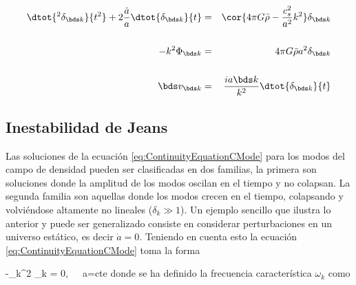 \begin{eqnarray}
\label{eq:ContinuityEquationCMode}
\dtot{^2 \delta_{\bds k}}{t^2} + 2\frac{\dot a}{a}\dtot{\delta_{\bds k}}{t} &=& 
\cor{ 4\pi G \bar \rho - \frac{c_s^2}{a^2}k^2 }\delta_{\bds k}\\
\nonumber{}
\\
\label{eq:EulerEquationCMode}
- k^2 \Phi_{\bds k} &=& 4\pi G \bar \rho a^2 \delta_{\bds k}\\
\nonumber{}
\\
\label{eq:PoissonEquationCMode}
\bds v_{\bds k} &=& \frac{i a \bds k}{k^2}\dtot{\delta_{\bds k}}{t}
\end{eqnarray}


	\subsection{Inestabilidad de Jeans}
	\label{subsec:JeansInstability}
	
	
Las soluciones de la ecuación \ref{eq:ContinuityEquationCMode} para los 
modos del campo de densidad pueden ser clasificadas en dos familias, la 
primera son soluciones donde la amplitud de los modos oscilan en el tiempo
y no colapsan. La segunda familia son aquellas donde los modos crecen en el 
tiempo, colapsando y volviéndose altamente no lineales ($\delta_k \gg 1$). 
Un ejemplo sencillo que ilustra lo anterior y puede ser generalizado 
consiste en considerar perturbaciones en un universo estático, es decir 
$\dot a = 0$. Teniendo en cuenta esto la ecuación 
\ref{eq:ContinuityEquationCMode} toma la forma


{ -\omega_k^2 \delta_{\bds k} = 0,\ \ \ a=\mbox{cte}}
donde se ha definido la frecuencia característica $\omega_k$ como


